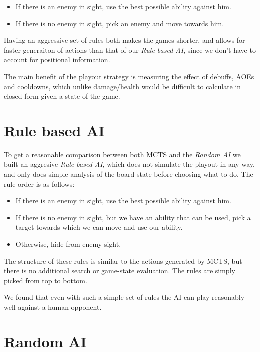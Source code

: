 \begin{itemize}
\item If there is an enemy in sight, use the best possible ability against him.
\item If there is no enemy in sight, pick an enemy and move towards him.
\end{itemize}

Having an aggressive set of rules both makes the games shorter, and allows for faster
generaiton of actions than that of our \emph{Rule based AI}, since we don't have to account
for positional information.

The main benefit of the playout strategy is measuring the effect of debuffs, AOEs and cooldowns,
which unlike damage/health would be difficult to calculate in closed form given a state of the game.


\section{Rule based AI}

To get a reasonable comparison between both MCTS and the \emph{Random AI} we
built an aggresive \emph{Rule based AI}, which does not simulate the playout in
any way, and only does simple analysis of the board state before choosing what
to do. The rule order is as follows:

\begin{itemize}
\item If there is an enemy in sight, use the best possible ability against him.
\item If there is no enemy in sight, but we have an ability that can be used, pick a target towards which we can move and use our ability.
\item Otherwise, hide from enemy sight.
\end{itemize}

The structure of these rules is similar to the actions generated by MCTS,
but there is no additional search or game-state evaluation. The rules are
simply picked from top to bottom.

We found that even with such a simple set of rules the AI can play reasonably
well against a human opponent.


\section{Random AI}

